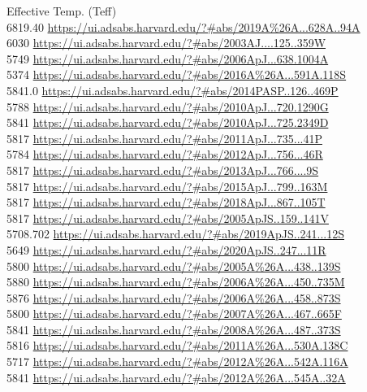 Effective Temp. (Teff)\\
6819.40 \url{https://ui.adsabs.harvard.edu/?#abs/2019A%26A...628A..94A}\\
6030 \url{https://ui.adsabs.harvard.edu/?#abs/2003AJ....125..359W}\\
5749 \url{https://ui.adsabs.harvard.edu/?#abs/2006ApJ...638.1004A}\\
5374 \url{https://ui.adsabs.harvard.edu/?#abs/2016A%26A...591A.118S}\\
5841.0 \url{https://ui.adsabs.harvard.edu/?#abs/2014PASP..126..469P}\\
5788 \url{https://ui.adsabs.harvard.edu/?#abs/2010ApJ...720.1290G}\\
5841 \url{https://ui.adsabs.harvard.edu/?#abs/2010ApJ...725.2349D}\\
5817 \url{https://ui.adsabs.harvard.edu/?#abs/2011ApJ...735...41P}\\
5784 \url{https://ui.adsabs.harvard.edu/?#abs/2012ApJ...756...46R}\\
5817 \url{https://ui.adsabs.harvard.edu/?#abs/2013ApJ...766....9S}\\
5817 \url{https://ui.adsabs.harvard.edu/?#abs/2015ApJ...799..163M}\\
5817 \url{https://ui.adsabs.harvard.edu/?#abs/2018ApJ...867..105T}\\
5817 \url{https://ui.adsabs.harvard.edu/?#abs/2005ApJS..159..141V}\\
5708.702 \url{https://ui.adsabs.harvard.edu/?#abs/2019ApJS..241...12S}\\
5649 \url{https://ui.adsabs.harvard.edu/?#abs/2020ApJS..247...11R}\\
5800 \url{https://ui.adsabs.harvard.edu/?#abs/2005A%26A...438..139S}\\
5880 \url{https://ui.adsabs.harvard.edu/?#abs/2006A%26A...450..735M}\\
5876 \url{https://ui.adsabs.harvard.edu/?#abs/2006A%26A...458..873S}\\
5800 \url{https://ui.adsabs.harvard.edu/?#abs/2007A%26A...467..665F}\\
5841 \url{https://ui.adsabs.harvard.edu/?#abs/2008A%26A...487..373S}\\
5816 \url{https://ui.adsabs.harvard.edu/?#abs/2011A%26A...530A.138C}\\
5717 \url{https://ui.adsabs.harvard.edu/?#abs/2012A%26A...542A.116A}\\
5841 \url{https://ui.adsabs.harvard.edu/?#abs/2012A%26A...545A..32A}\\
